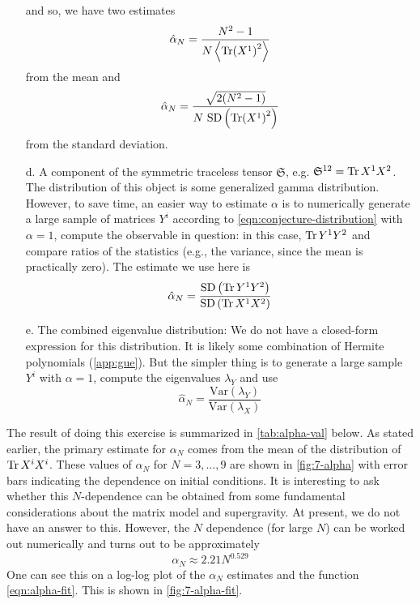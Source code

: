 \begin{enumerate}
{        and so, we have two estimates
        \begin{equation}
            \hat{\alpha}_N = \frac{N^2 - 1}{N \expval{\Tr (X^1)^2}}
        \end{equation}
        from the mean and
        \begin{equation}
            \hat{\alpha}_N = \frac{\sqrt{2(N^2 - 1)}}{N \ \mathrm{SD}\left( \Tr (X^1)^2 \right)}
        \end{equation}
        from the standard deviation.
    }
    \item[d.] {
        A component of the symmetric traceless tensor $\mathfrak{S}$, e.g. $\mathfrak{S}^{1 2} = \Tr X^1 X^2$. The distribution of this object is some generalized gamma distribution. However, to save time, an easier way to estimate $\alpha$ is to numerically generate a large sample of matrices $Y^i$ according to \cref{eqn:conjecture-distribution} with $\alpha = 1$, compute the observable in question: in this case, $\Tr Y^1 Y^2$ and compare ratios of the statistics (e.g., the variance, since the mean is practically zero). The estimate we use here is
        \begin{equation}
            \hat{\alpha}_N = \frac{\mathrm{SD}\left(\Tr Y^1 Y^2\right)}{\mathrm{SD}\left(\Tr X^1 X^2\right)}
        \end{equation}
    }
    \item[e.] {
        The combined eigenvalue distribution: We do not have a closed-form expression for this distribution. It is likely some combination of Hermite polynomials (\cref{app:gue}). But the simpler thing is to generate a large sample $Y^i$ with $\alpha = 1$, compute the eigenvalues $\lambda_Y$ and use
        \begin{equation}
            \hat{\alpha}_N = \frac{\mathrm{Var}\left(\lambda_Y\right)}{\mathrm{Var}\left(\lambda_X\right)}
        \end{equation}
    }
    \end{enumerate}

The result of doing this exercise is summarized in \cref{tab:alpha-val} below. As stated earlier, the primary estimate for $\alpha_N$ comes from the mean of the distribution of $\Tr X^i X^i$. These values of $\alpha_N$ for $N = 3, \ldots, 9$ are shown in \cref{fig:7-alpha} with error bars indicating the dependence on initial conditions. It is interesting to ask whether this $N$-dependence can be obtained from some fundamental considerations about the matrix model and supergravity. At present, we do not have an answer to this. However, the $N$ dependence (for large $N$) can be worked out numerically and turns out to be approximately
\begin{equation}\label{eqn:alpha-fit}
    \alpha_N \approx 2.21 N^{0.529}
\end{equation}
One can see this on a log-log plot of the $\alpha_N$ estimates and the function \cref{eqn:alpha-fit}. This is shown in \cref{fig:7-alpha-fit}.

